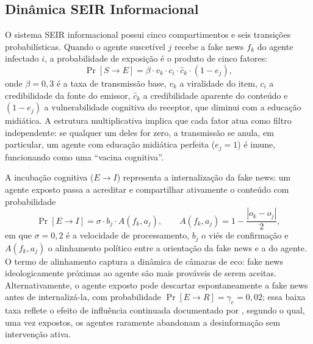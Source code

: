 \documentclass[12pt,a4paper]{article}
\theoremstyle{definition}
\theoremstyle{plain}
\begin{document}
\subsection{Dinâmica SEIR Informacional}
\label{subsec:seir}

O sistema SEIR informacional possui cinco compartimentos e seis transições probabilísticas. Quando o agente suscetível $j$ recebe a fake news $f_k$ do agente infectado $i$, a probabilidade de exposição é o produto de cinco fatores:
\begin{equation}
\Pr[S \to E] = \beta \cdot v_k \cdot c_i \cdot \hat{c}_k \cdot (1 - e_j),
\label{eq:SE}
\end{equation}
onde $\beta = 0{,}3$ é a taxa de transmissão base, $v_k$ a viralidade do item, $c_i$ a credibilidade da fonte do emissor, $\hat{c}_k$ a credibilidade aparente do conteúdo e $(1-e_j)$ a vulnerabilidade cognitiva do receptor, que diminui com a educação midiática. A estrutura multiplicativa implica que cada fator atua como filtro independente: se qualquer um deles for zero, a transmissão se anula, em particular, um agente com educação midiática perfeita ($e_j = 1$) é imune, funcionando como uma ``vacina cognitiva''.

A incubação cognitiva ($E \to I$) representa a internalização da fake news: um agente exposto passa a acreditar e compartilhar ativamente o conteúdo com probabilidade
\begin{equation}
\Pr[E \to I] = \sigma \cdot b_j \cdot A(f_k, a_j), \qquad A(f_k, a_j) = 1 - \frac{|o_k - o_j|}{2},
\label{eq:EI}
\end{equation}
em que $\sigma = 0{,}2$ é a velocidade de processamento, $b_j$ o viés de confirmação e $A(f_k, a_j)$ o alinhamento político entre a orientação da fake news e a do agente. O termo de alinhamento captura a dinâmica de câmaras de eco: fake news ideologicamente próximas ao agente são mais prováveis de serem aceitas. Alternativamente, o agente exposto pode descartar espontaneamente a fake news antes de internalizá-la, com probabilidade $\Pr[E \to R] = \gamma_e = 0{,}02$; essa baixa taxa reflete o efeito de influência continuada documentado por \citet{lewandowsky2012misinformation}, segundo o qual, uma vez expostos, os agentes raramente abandonam a desinformação sem intervenção ativa.
\end{document}
